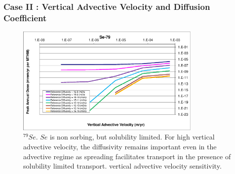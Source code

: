 \begin{frame}[c]
  \frametitle{Case II : Vertical Advective Velocity and Diffusion Coefficient}
\begin{figure}[ht!]
\centering
\includegraphics[width=0.8\textwidth]{AdvVelAndDiffCoeffEBSFail/Se-79-VAdvVel.eps}
\caption{$^{79}Se$.
$Se$ is non sorbing, but solubility limited.  
For high vertical advective 
velocity, the diffusivity remains important even in the advective regime as 
spreading facilitates transport in the presence of solubility limited transport. 
vertical advective velocity sensitivity.}
\label{fig:VAdvVelSe79VAdvVel}
\end{figure}
\end{frame}

